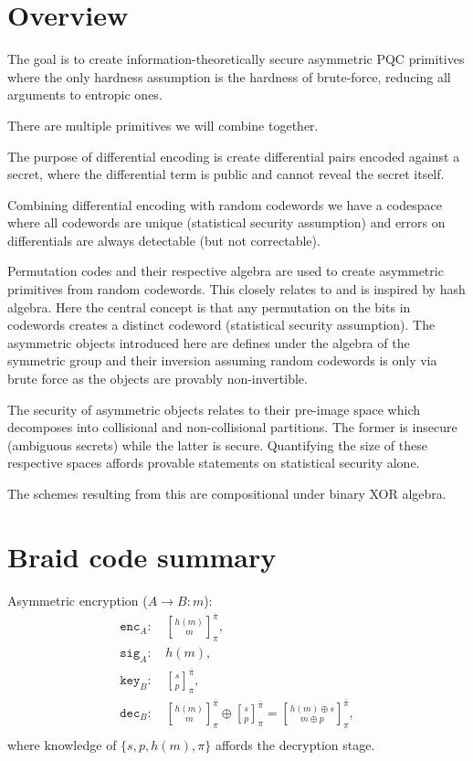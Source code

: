 \documentclass[twocolumn, aps, amsmath, amssymb, nofootinbib, superscriptaddress, longbibliography, doublefloatfix, table-of-contents, eqsecnum, rmp]{revtex4-2}
\newcommand{\stackbraid}[2]{{\genfrac{[}{]}{0pt}{}{{#1}}{{#2}}}^{\bar{\pi}}_{\pi}}
\begin{document}
\section{Overview}

The goal is to create information-theoretically secure asymmetric PQC primitives where the only hardness assumption is the hardness of brute-force, reducing all arguments to entropic ones.

There are multiple primitives we will combine together.

The purpose of differential encoding is create differential pairs encoded against a secret, where the differential term is public and cannot reveal the secret itself.

Combining differential encoding with random codewords we have a codespace where all codewords are unique (statistical security assumption) and errors on differentials are always detectable (but not correctable).

Permutation codes and their respective algebra are used to create asymmetric primitives from random codewords. This closely relates to and is inspired by hash algebra. Here the central concept is that any permutation on the bits in codewords creates a distinct codeword (statistical security assumption). The asymmetric objects introduced here are defines under the algebra of the symmetric group and their inversion assuming random codewords is only via brute force as the objects are provably non-invertible.

The security of asymmetric objects relates to their pre-image space which decomposes into collisional and non-collisional partitions. The former is insecure (ambiguous secrets) while the latter is secure. Quantifying the size of these respective spaces affords provable statements on statistical security alone.

The schemes resulting from this are compositional under binary XOR algebra.

\section{Braid code summary}

Asymmetric encryption ($A\to B: m$):
\begin{align}
	\mathtt{enc}_A:\, &\stackbraid{h(m)}{m},\nonumber\\
	\mathtt{sig}_A:\, &h(m),\nonumber\\
	\mathtt{key}_B:\, &\stackbraid{s}{p},\nonumber\\
	\mathtt{dec}_B:\, &\stackbraid{h(m)}{m}\oplus \stackbraid{s}{p} = \stackbraid{h(m)\oplus s}{m\oplus p},\nonumber\\
\end{align}
where knowledge of $\{s,p,h(m),\pi\}$ affords the decryption stage.
\end{document}
